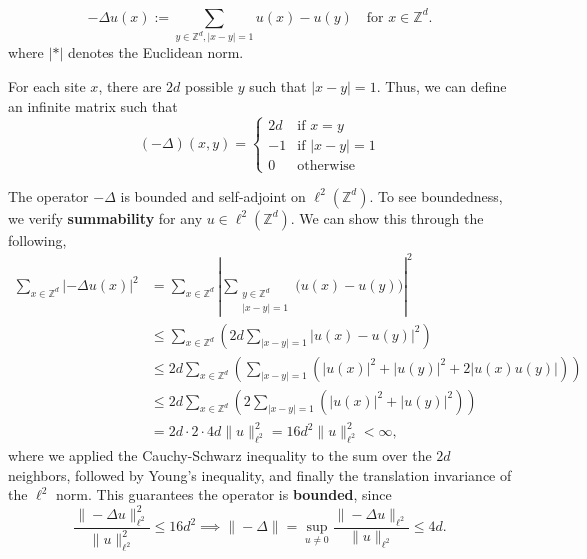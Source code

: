\documentclass[11pt, a4paper, UKenglish, oneside]{book}
\theoremstyle{plain}
\theoremstyle{remark}
\theoremstyle{definition}
\numberwithin{equation}{section}
\numberwithin{theorem}{section}
\begin{document}
\begin{equation}
    -\Delta u(x) := \sum_{y \in \mathbb{Z}^d,|x-y|=1} u(x) - u(y) \quad \text{for } x \in \mathbb{Z}^d.
\end{equation}
where $|*|$ denotes the Euclidean norm.

For each site $x$, there are $2d$ possible $y$ such that $|x-y|=1$. Thus, we can define an infinite matrix such that \[
(-\Delta)(x,y) = \begin{cases} 
2d & \text{if } x = y  \\
-1 & \text{if } |x - y| = 1  \\
0 & \text{otherwise}
\end{cases}
\]

The operator $-\Delta$ is bounded and self-adjoint on $\ell^2(\mathbb{Z}^d)$. To see boundedness, we verify \textbf{summability} for any $u \in \ell^2(\mathbb{Z}^d)$. We can show this through the following,
\begin{align*}
\sum_{x \in \mathbb{Z}^d} |-\Delta u(x)|^2 &= \sum_{x \in \mathbb{Z}^d} | \sum_{\substack{y \in \mathbb{Z}^d \\ |x - y| = 1}} \bigl(u(x) - u(y)\bigr)|^2 \\
&\leq  \sum_{x \in \mathbb{Z}^d} \left(2d \sum_{|x - y| = 1} |u(x) - u(y)|^2 \right) \\
&\leq 2d \sum_{x \in \mathbb{Z}^d} \left( \sum_{|x - y| = 1} \left(|u(x)|^2 + |u(y)|^2+2|u(x)u(y)|\right) \right) \\
&\leq 2d \sum_{x \in \mathbb{Z}^d} \left( 2 \sum_{|x - y| = 1} \left(|u(x)|^2 + |u(y)|^2\right) \right) \\
&= 2d \cdot 2 \cdot 4d \|u\|_{\ell^2}^2 = 16d^2 \|u\|_{\ell^2}^2 < \infty,
\end{align*}
where we applied the Cauchy-Schwarz inequality to the sum over the $2d$ neighbors, followed by Young's inequality, and finally the translation invariance of the $\ell^2$ norm. 
This guarantees the operator is \textbf{bounded}, since
\[
\frac{\|-\Delta u\|_{\ell^2}^2}{\|u\|_{\ell^2}^2} \le 16 d^2 \implies \|-\Delta\| = \sup_{u \ne 0} \frac{\|-\Delta u\|_{\ell^2}}{\|u\|_{\ell^2}} \le 4d.
\]
\end{document}

